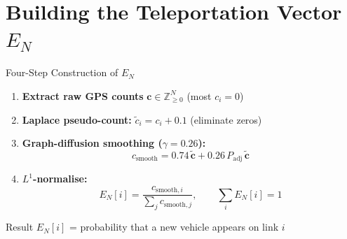 \documentclass[aspectratio=169,12pt]{beamer}
\begin{document}
\section{Building the Teleportation Vector $E_N$}

\begin{frame}{Four-Step Construction of $E_N$}
  \begin{enumerate}
    \item \textbf{Extract raw GPS counts} $\mathbf{c} \in \mathbb{Z}_{\geq 0}^N$
          \hfill {\small (most $c_i = 0$)}
    \item \textbf{Laplace pseudo-count:}
          $\tilde{c}_i = c_i + 0.1$
          \hfill {\small (eliminate zeros)}
    \item \textbf{Graph-diffusion smoothing ($\gamma = 0.26$):}
      \[
        c_{\text{smooth}} = 0.74\,\tilde{\mathbf{c}}
        + 0.26\,P_{\text{adj}}\,\tilde{\mathbf{c}}
      \]
    \item \textbf{$L^1$-normalise:}
      \[
        E_N[i] = \frac{c_{\text{smooth},i}}{\sum_j c_{\text{smooth},j}},
        \qquad \sum_i E_N[i] = 1
      \]
  \end{enumerate}

  \medskip
  \begin{block}{Result}
    $E_N[i]$ = probability that a new vehicle appears on link $i$
  \end{block}
\end{frame}
\end{document}
